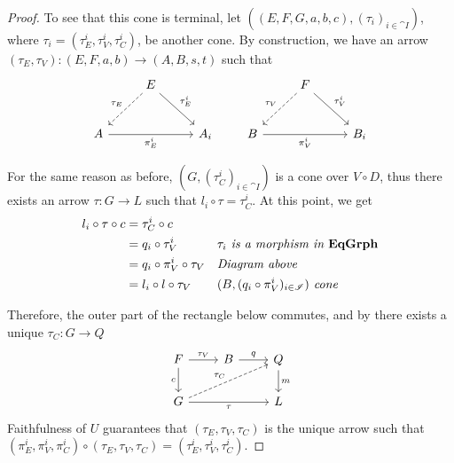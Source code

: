 \begin{proof}
	To see that this cone is terminal, let $((E, F, G, a, b, c), (\tau_i)_{i \in \cat I})$, where $\tau_i = (\tau_E^i, \tau_V^i, \tau_C^i)$, be another cone. By construction, we have an arrow $(\tau_E, \tau_V):(E, F, a, b) \to (A, B, s, t)$ such that
    \[
        \begin{tikzcd}[row sep = 26, column sep = 26]
            & E \arrow[dl, dashed, "{\tau_E}" swap] \arrow[dr, "{\tau_E^i}"] & \\
            A \arrow[rr, "{\pi_E^i}" swap] & & A_i 
        \end{tikzcd}
        \qquad
        \begin{tikzcd}[row sep = 26, column sep = 26]
            & F \arrow[dl, dashed, "{\tau_V}" swap] \arrow[dr, "{\tau_V^i}"] & \\
            B \arrow[rr, "{\pi_V^i}" swap] & & B_i 
        \end{tikzcd}
    \]

    For the same reason as before, $(G, (\tau_C^i)_{i\in \cat I})$ is a cone over $V \circ D$, thus there exists an arrow $\tau : G \to L$ such that $l_i \circ \tau = \tau_C^i$. At this point, we get
    \begin{align*}
        l_i\circ \tau \circ c 
                        &= \tau_C^i\circ c              && \\
                        &=q_i\circ \tau_V^i             && \textit{$\tau_i$ is a morphism in $\mathbf{EqGrph}$}\\
                        &=q_i\circ \pi_V^i\circ \tau_V  && \textit{Diagram above} \\
                        &=l_i\circ l\circ \tau_V        && \textit{$(B, (q_i\circ \pi_V^i)_{i \in \mathscr{I}})$ cone} 
    \end{align*} 

	Therefore, the outer part of the rectangle below commutes, and by  there exists a unique $\tau_C: G \to Q$
    \[
        \begin{tikzcd}
            F \arrow[r, "{\tau_V}"] \arrow[d, "c"swap] & B \arrow[r, "q"] & Q \arrow[d, "m"] \\
            G \arrow[urr, dashed, "{\tau_C}"] \arrow[rr, "{\tau}"swap] & & L
        \end{tikzcd}
    \]
     Faithfulness of $U$ guarantees that $(\tau_E, \tau_V, \tau_C)$ is the unique arrow such that $(\pi_E^i, \pi_V^i, \pi_C^i) \circ (\tau_E, \tau_V, \tau_C) = (\tau_E^i, \tau_V^i, \tau_C^i)$.


\end{proof}
